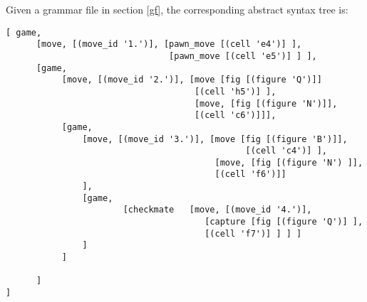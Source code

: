 \documentclass[a4paper,10pt]{article}
\def\st{\noindent}
\begin{document}
\st
Given a grammar file in section \ref{gf}, the corresponding abstract syntax tree is:

\begin{verbatim}
[ game,
      [move, [(move_id '1.')], [pawn_move [(cell 'e4')] ], 
                                [pawn_move [(cell 'e5')] ] ],
      [game, 
           [move, [(move_id '2.')], [move [fig [(figure 'Q')]] 
                                     [(cell 'h5')] ], 
                                     [move, [fig [(figure 'N')]], 
                                     [(cell 'c6')]]],
           [game,
               [move, [(move_id '3.')], [move [fig [(figure 'B')]],
                                               [(cell 'c4')] ], 
                                         [move, [fig [(figure 'N') ]], 
                                         [(cell 'f6')]]
               ],
               [game,
                       [checkmate   [move, [(move_id '4.')],
                                       [capture [fig [(figure 'Q')] ], 
                                       [(cell 'f7')] ] ] ]
               ]
           ]
            
      ]  
]
\end{verbatim}



   


\end{document}
